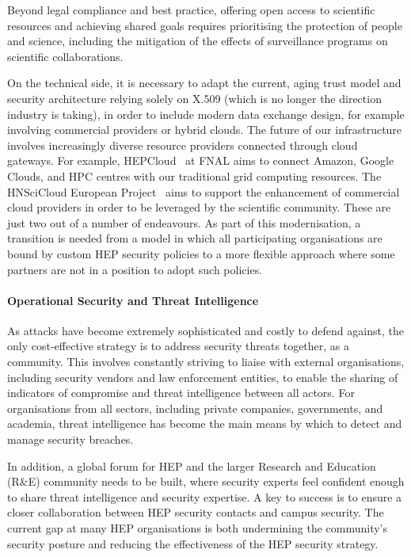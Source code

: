 Beyond legal compliance and best practice, offering open access to
scientific resources and achieving shared goals requires prioritising
the protection of people and science, including the mitigation of the
effects of surveillance programs on scientific collaborations.

On the technical side, it is necessary to adapt the current, aging trust
model and security architecture relying solely on X.509 (which is no longer
the direction industry is taking), in order to include modern data
exchange design, for example involving commercial providers or hybrid
clouds. The future of our infrastructure involves increasingly diverse
resource providers connected through cloud gateways. For example,
HEPCloud~\cite{HEPCloud} at FNAL aims to connect Amazon,
Google Clouds, and HPC centres with our traditional grid computing
resources. The HNSciCloud European Project~\cite{HNSciCloud} aims to
support the enhancement of commercial cloud providers in order to be
leveraged by the scientific community. These are just two out of a
number of endeavours. As part of this modernisation, a transition is
needed from a model in which all participating organisations are bound
by custom HEP security policies to a more flexible approach where some
partners are not in a position to adopt such policies.

\paragraph{Operational Security and Threat Intelligence}

As attacks have become extremely sophisticated and costly to defend
against, the only cost-effective strategy is to address security threats
together, as a community. This involves constantly striving to liaise
with external organisations, including security vendors and law
enforcement entities, to enable the sharing of indicators of compromise
and threat intelligence between all actors. For organisations from all
sectors, including private companies, governments, and academia, threat
intelligence has become the main means by which to detect and manage
security breaches.

In addition, a global forum for HEP and the larger Research and Education
(R\&E) community needs to be built, where security experts feel
confident enough to share threat intelligence and security expertise. A
key to success is to ensure a closer collaboration between HEP security
contacts and campus security. The current gap at many HEP organisations
is both undermining the community's security posture and reducing the
effectiveness of the HEP security strategy.

